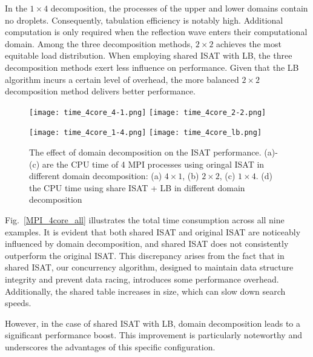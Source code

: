 In the $1\times4$ decomposition, the processes of the upper and lower domains contain no droplets. Consequently, tabulation efficiency is notably high. Additional computation is only required when the reflection wave enters their computational domain. Among the three decomposition methods, $2\times2$ achieves the most equitable load distribution. When employing shared ISAT with LB, the three decomposition methods exert less influence on performance. Given that the LB algorithm incurs a certain level of overhead, the more balanced $2\times2$ decomposition method delivers better performance.

\begin{figure}[htbp]
    \centering
\texttt{[image: time\_4core\_4-1.png]} 
\texttt{[image: time\_4core\_2-2.png]} 

\texttt{[image: time\_4core\_1-4.png]} 
\texttt{[image: time\_4core\_lb.png]} 
\caption{The effect of domain decomposition on the ISAT performance. (a)-(c) are the CPU time of 4 MPI processes using oringal ISAT in different domain decomposition: (a) $4\times1$, (b) $2\times2$, (c) $1\times4$. (d) the CPU time using share ISAT + LB in different domain decomposition}\label{MPI_4core} 
\end{figure}


Fig.~\ref{MPI_4core_all} illustrates the total time consumption across all nine examples. It is evident that both shared ISAT and original ISAT are noticeably influenced by domain decomposition, and shared ISAT does not consistently outperform the original ISAT. This discrepancy arises from the fact that in shared ISAT, our concurrency algorithm, designed to maintain data structure integrity and prevent data racing, introduces some performance overhead. Additionally, the shared table increases in size, which can slow down search speeds.

However, in the case of shared ISAT with LB, domain decomposition leads to a significant performance boost. This improvement is particularly noteworthy and underscores the advantages of this specific configuration.


